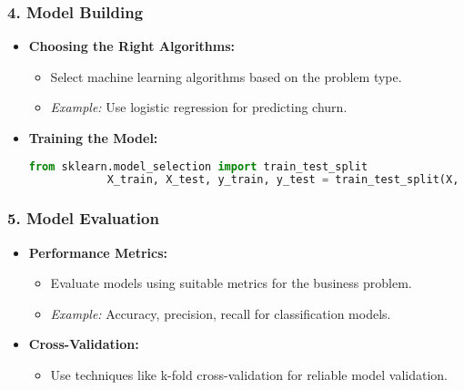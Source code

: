 \documentclass[aspectratio=169]{beamer}
\begin{document}
\begin{frame}[fragile]
    \frametitle{4. Model Building}
    \begin{itemize}
        \item \textbf{Choosing the Right Algorithms:}
            \begin{itemize}
                \item Select machine learning algorithms based on the problem type.
                \item \textit{Example:} Use logistic regression for predicting churn.
            \end{itemize}
        \item \textbf{Training the Model:}
            \begin{lstlisting}[language=Python]
            from sklearn.model_selection import train_test_split
            X_train, X_test, y_train, y_test = train_test_split(X, y, test_size=0.2, random_state=42)
            \end{lstlisting}
    \end{itemize}
\end{frame}

\begin{frame}[fragile]
    \frametitle{5. Model Evaluation}
    \begin{itemize}
        \item \textbf{Performance Metrics:}
            \begin{itemize}
                \item Evaluate models using suitable metrics for the business problem.
                \item \textit{Example:} Accuracy, precision, recall for classification models.
            \end{itemize}
        \item \textbf{Cross-Validation:}
            \begin{itemize}
                \item Use techniques like k-fold cross-validation for reliable model validation.
            \end{itemize}
    \end{itemize}
\end{frame}
\end{document}
